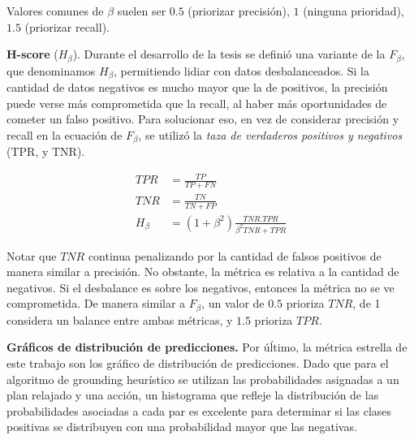 Valores comunes de $\beta$ suelen ser $0.5$ (priorizar precisión), $1$ (ninguna
prioridad), $1.5$ (priorizar recall).

\textbf{H-score} ($H_{\beta}$). Durante el desarrollo de la tesis se definió una
variante de la $F_{\beta}$, que denominamos $H_{\beta}$, permitiendo lidiar con
datos desbalanceados. Si la cantidad de datos negativos es mucho mayor que la de
positivos, la precisión puede verse más comprometida que la recall, al haber más
oportunidades de cometer un falso positivo. Para solucionar eso, en vez de
considerar precisión y recall en la ecuación de $F_{\beta}$, se utilizó la
\emph{taza de verdaderos positivos y negativos} (TPR, y TNR).

\begin{align}
    TPR &= \frac{TP}{TP + FN} \\
    TNR &= \frac{TN}{TN + FP} \\
    H_{\beta} &= (1 + \beta^2) \frac{TNR . TPR}{\beta^2 TNR + TPR}
\end{align}

Notar que $TNR$ continua penalizando por la cantidad de falsos positivos de
manera similar a precisión. No obstante, la métrica es relativa a la cantidad de
negativos. Si el desbalance es sobre los negativos, entonces la métrica no se ve
comprometida. De manera similar a $F_{\beta}$, un valor de $0.5$ prioriza $TNR$,
de 1 considera un balance entre ambas métricas, y $1.5$ prioriza $TPR$.

\textbf{Gráficos de distribución de predicciones.} Por úĺtimo, la métrica
estrella de este trabajo son los gráfico de distribución de predicciones. Dado
que para el algoritmo de grounding heurístico se utilizan las probabilidades
asignadas a un plan relajado y una acción, un histograma que refleje la
distribución de las probabilidades asociadas a cada par es excelente para
determinar si las clases positivas se distribuyen con una probabilidad mayor que
las negativas.